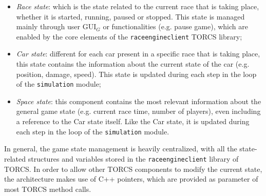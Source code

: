 \begin{itemize}
	\item \textit{Race state}: which is the state related to the current race that is taking place, whether it is started, running, paused or stopped. This state is managed mainly through user GUI$_G$ or functionalities (e.g. pause game), which are enabled by the core elements of the \texttt{raceengineclient} TORCS library;
	\item \textit{Car state}: different for each car present in a specific race that is taking place, this state contains the information about the current state of the car (e.g. position, damage, speed). This state is updated during each step in the loop of the \texttt{simulation} module;
	\item \textit{Space state}: this component contains the most relevant information about the general game state (e.g. current race time, number of players), even including a reference to the Car state itself. Like the Car state, it is updated during each step in the loop of the \texttt{simulation} module. 
\end{itemize}
In general, the game state management is heavily centralized, with all the state-related structures and variables stored in the \texttt{raceengineclient} library of TORCS. In order to allow other TORCS components to modify the current state, the architecture makes use of C++ pointers, which are provided as parameter of most TORCS method calls. 
\pagebreak

